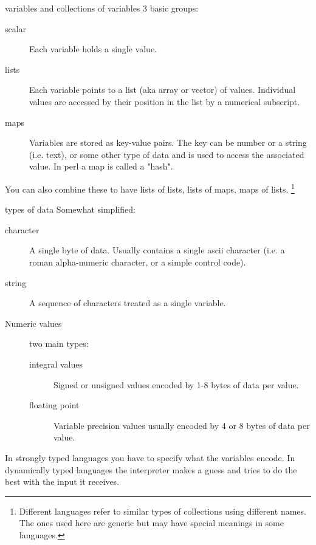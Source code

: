 \documentclass[pdf]{beamer}
\newcommand\blfootnote[1]{%
  \begingroup  %
  \renewcommand\thefootnote{}\footnote{#1}%
  \addtocounter{footnote}{-1}  %
  \endgroup
}
\begin{document}
\begin{frame}[fragile]{variables and collections of variables}
  3 basic groups:
  \begin{description}
  \item[scalar] Each variable holds a single value.
  \item[lists] Each variable points to a list (aka array or vector) of
    values. Individual values are accessed by their position in the list by a
    numerical subscript.
  \item[maps] Variables are stored as key-value pairs. The key can be number
    or a string (i.e. text), or some other type of data and is used to
    access the associated value. In perl a map is called a "hash".
  \end{description}

  You can also combine these to have lists of lists, lists of maps, maps of
  lists.
  \blfootnote{Different languages refer to similar types of collections using
    different names. The ones used here are generic but may have special
    meanings in some languages.}
\end{frame}

\begin{frame}[fragile]{types of data}
  Somewhat simplified:
  \begin{description}
  \item[character] A single byte of data. Usually contains a single ascii
    character (i.e. a roman alpha-numeric character, or a simple control code).
  \item[string] A sequence of characters treated as a single
    variable.
  \item[Numeric values] two main types:
    \begin{description}
    \item[integral values] Signed or unsigned values encoded by 1-8 bytes of
      data per value.
    \item[floating point] Variable precision values usually encoded by 4 or 8
      bytes of data per value.
    \end{description}
  \end{description}
  
  In strongly typed languages you have to specify what the variables
  encode. In dynamically typed languages the interpreter makes a guess and
  tries to do the best with the input it receives.
\end{frame}
\end{document}
